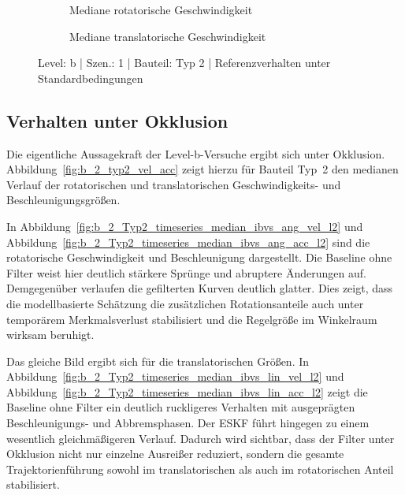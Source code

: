 \begin{figure}[htbp]
    \centering
    \begin{subfigure}[b]{0.49\textwidth}
        \caption{Mediane rotatorische Geschwindigkeit}
        \label{fig:b_1_Typ2_timeseries_median_ibvs_ang_vel_l2}
    \end{subfigure}
    \hfill
    \begin{subfigure}[b]{0.49\textwidth}
        \caption{Mediane translatorische Geschwindigkeit}
        \label{fig:b_1_Typ2_timeseries_median_ibvs_lin_vel_l2}
    \end{subfigure}
    \caption{Level: b | Szen.: 1 | Bauteil: Typ 2 | Referenzverhalten unter Standardbedingungen}
    \label{fig:b_1_typ2_baseline}
\end{figure}

\subsection{Verhalten unter Okklusion}

Die eigentliche Aussagekraft der Level-b-Versuche ergibt sich unter Okklusion. Abbildung~\ref{fig:b_2_typ2_vel_acc} zeigt hierzu für Bauteil Typ~2 den medianen Verlauf der rotatorischen und translatorischen Geschwindigkeits- und Beschleunigungsgrößen.

In Abbildung~\ref{fig:b_2_Typ2_timeseries_median_ibvs_ang_vel_l2} und Abbildung~\ref{fig:b_2_Typ2_timeseries_median_ibvs_ang_acc_l2} sind die rotatorische Geschwindigkeit und Beschleunigung dargestellt. Die Baseline ohne Filter weist hier deutlich stärkere Sprünge und abruptere Änderungen auf. Demgegenüber verlaufen die gefilterten Kurven deutlich glatter. Dies zeigt, dass die modellbasierte Schätzung die zusätzlichen Rotationsanteile auch unter temporärem Merkmalsverlust stabilisiert und die Regelgröße im Winkelraum wirksam beruhigt.

Das gleiche Bild ergibt sich für die translatorischen Größen. In Abbildung~\ref{fig:b_2_Typ2_timeseries_median_ibvs_lin_vel_l2} und Abbildung~\ref{fig:b_2_Typ2_timeseries_median_ibvs_lin_acc_l2} zeigt die Baseline ohne Filter ein deutlich ruckligeres Verhalten mit ausgeprägten Beschleunigungs- und Abbremsphasen. Der \ac{ESKF} führt hingegen zu einem wesentlich gleichmäßigeren Verlauf. Dadurch wird sichtbar, dass der Filter unter Okklusion nicht nur einzelne Ausreißer reduziert, sondern die gesamte Trajektorienführung sowohl im translatorischen als auch im rotatorischen Anteil stabilisiert.

